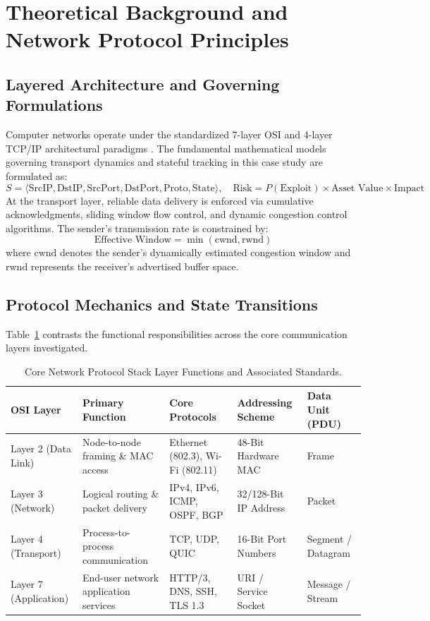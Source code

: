 \section{Theoretical Background and Network Protocol Principles}

\subsection{Layered Architecture and Governing Formulations}
Computer networks operate under the standardized 7-layer OSI and 4-layer TCP/IP architectural paradigms \cite{stallings2017data}. The fundamental mathematical models governing transport dynamics and stateful tracking in this case study are formulated as:
\begin{equation}
  S = \langle \text{SrcIP}, \text{DstIP}, \text{SrcPort}, \text{DstPort}, \text{Proto}, \text{State} \rangle, \quad \text{Risk} = P(\text{Exploit}) \times \text{Asset Value} \times \text{Impact}
\label{eq:core_math}
\end{equation}
At the transport layer, reliable data delivery is enforced via cumulative acknowledgments, sliding window flow control, and dynamic congestion control algorithms. The sender's transmission rate is constrained by:
\begin{equation}
  \text{Effective Window} = \min(\text{cwnd}, \text{rwnd})
\end{equation}
where $\text{cwnd}$ denotes the sender's dynamically estimated congestion window and $\text{rwnd}$ represents the receiver's advertised buffer space.

\subsection{Protocol Mechanics and State Transitions}
Table~\ref{tab:layer_comp} contrasts the functional responsibilities across the core communication layers investigated.
\begin{table}[H]
\centering
\caption{Core Network Protocol Stack Layer Functions and Associated Standards.}
\label{tab:layer_comp}
\begin{tabularx}{\linewidth}{lXXXX}
\toprule
\textbf{OSI Layer} & \textbf{Primary Function} & \textbf{Core Protocols} & \textbf{Addressing Scheme} & \textbf{Data Unit (PDU)} \\
\midrule
Layer 2 (Data Link) & Node-to-node framing \& MAC access & Ethernet (802.3), Wi-Fi (802.11) & 48-Bit Hardware MAC & Frame \\
Layer 3 (Network) & Logical routing \& packet delivery & IPv4, IPv6, ICMP, OSPF, BGP & 32/128-Bit IP Address & Packet \\
Layer 4 (Transport) & Process-to-process communication & TCP, UDP, QUIC & 16-Bit Port Numbers & Segment / Datagram \\
Layer 7 (Application) & End-user network application services & HTTP/3, DNS, SSH, TLS 1.3 & URI / Service Socket & Message / Stream \\
\bottomrule
\end{tabularx}
\end{table}

